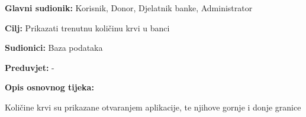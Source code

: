 \noindent {}
					\begin{packed_item}
	
						\item \textbf{Glavni sudionik: }Korisnik, Donor, Djelatnik banke, Administrator
						\item \textbf{Cilj:} Prikazati trenutnu količinu krvi u banci
						\item \textbf{Sudionici:} Baza podataka
						\item \textbf{Preduvjet:} -
						\item \textbf{Opis osnovnog tijeka:}
						
						\item[] \begin{packed_enum}
	
							\item Količine krvi su prikazane otvaranjem aplikacije, te njihove gornje i donje granice
							
						\end{packed_enum}

					\end{packed_item}

